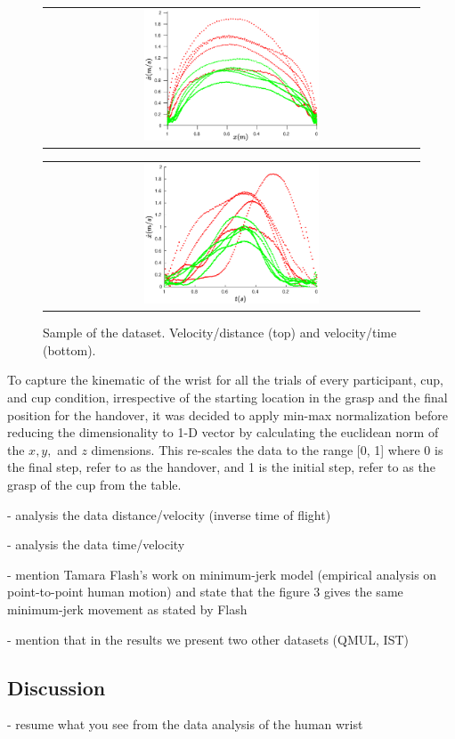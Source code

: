     \begin{figure}
        \centering
        \begin{tabular}{@{}c@{}}
            \centering
            \includegraphics[width=0.48\textwidth,height=0.25\textheight]{Images/vel_distance_plot.eps}
        \end{tabular}
        \baselineskip
        \begin{tabular}{@{}c@{}}
            \centering 
            \includegraphics[width=0.48\textwidth,height=0.25\textheight]{Images/vel_time_plot.eps}
        \end{tabular}
        \caption{Sample of the dataset. Velocity/distance (top) and velocity/time (bottom).}
        \label{fig:vel_distance_time}
    \end{figure}

To capture the kinematic of the wrist for all the trials of every participant, cup, and cup condition, irrespective of the starting location in the grasp and the final position for the handover, it was decided to apply min-max normalization before reducing the dimensionality to 1-D vector by calculating the euclidean norm of the $x, y,$ and $z$ dimensions. This re-scales the data to the range [0, 1] where 0 is the final step, refer to as the handover, and 1 is the initial step, refer to as the grasp of the cup from the table. 

- analysis the data distance/velocity (inverse time of flight)

- analysis the data time/velocity

- mention Tamara Flash's work on minimum-jerk model (empirical analysis on point-to-point human motion) and state that the figure 3 gives the same minimum-jerk movement as stated by Flash

- mention that in the results we present two other datasets (QMUL, IST)

\subsection{Discussion}

- resume what you see from the data analysis of the human wrist

